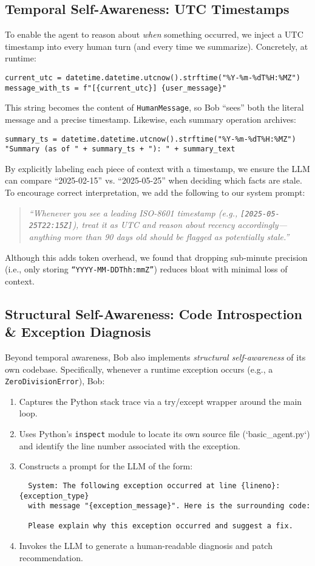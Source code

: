 \documentclass[11pt]{article}
\begin{document}
\subsection{Temporal Self-Awareness: UTC Timestamps}
To enable the agent to reason about \emph{when} something occurred, we inject a UTC timestamp into every human turn (and every time we summarize). Concretely, at runtime:
\begin{verbatim}
current_utc = datetime.datetime.utcnow().strftime("%Y-%m-%dT%H:%MZ")
message_with_ts = f"[{current_utc}] {user_message}"
\end{verbatim}
This string becomes the content of \texttt{HumanMessage}, so Bob “sees” both the literal message and a precise timestamp. Likewise, each summary operation archives:
\begin{verbatim}
summary_ts = datetime.datetime.utcnow().strftime("%Y-%m-%dT%H:%MZ")
"Summary (as of " + summary_ts + "): " + summary_text
\end{verbatim}
By explicitly labeling each piece of context with a timestamp, we ensure the LLM can compare “2025-02-15” vs. “2025-05-25” when deciding which facts are stale. To encourage correct interpretation, we add the following to our system prompt:
\begin{quote}
\textit{“Whenever you see a leading ISO-8601 timestamp (e.g., \texttt{[2025-05-25T22:15Z]}), treat it as UTC and reason about recency accordingly—anything more than 90 days old should be flagged as potentially stale.”}
\end{quote}
Although this adds token overhead, we found that dropping sub-minute precision (i.e., only storing \texttt{“YYYY-MM-DDThh:mmZ”}) reduces bloat with minimal loss of context.

\subsection{Structural Self-Awareness: Code Introspection \& Exception Diagnosis}
Beyond temporal awareness, Bob also implements \emph{structural self-awareness} of its own codebase. Specifically, whenever a runtime exception occurs (e.g., a \texttt{ZeroDivisionError}), Bob:
\begin{enumerate}[leftmargin=*]
  \item Captures the Python stack trace via a try/except wrapper around the main loop.
  \item Uses Python’s \texttt{inspect} module to locate its own source file (`basic_agent.py`) and identify the line number associated with the exception.
  \item Constructs a prompt for the LLM of the form:
  \begin{verbatim}
  System: The following exception occurred at line {lineno}: {exception_type}
  with message "{exception_message}". Here is the surrounding code:

  Please explain why this exception occurred and suggest a fix.
\end{verbatim}
\item Invokes the LLM to generate a human-readable diagnosis and patch recommendation.
\end{enumerate}
\end{document}
